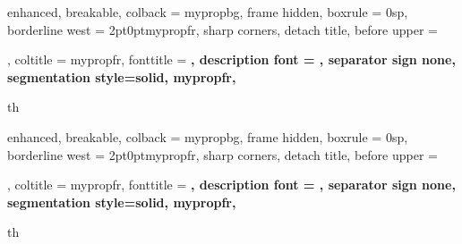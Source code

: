 
{%
	enhanced,
	breakable,
	colback = mypropbg,
	frame hidden,
	boxrule = 0sp,
	borderline west = {2pt}{0pt}{mypropfr},
	sharp corners,
	detach title,
	before upper = \tcbtitle\par\smallskip,
	coltitle = mypropfr,
	fonttitle = \bfseries\sffamily,
	description font = \mdseries,
	separator sign none,
	segmentation style={solid, mypropfr},
}
{th}

{%
	enhanced,
	breakable,
	colback = mypropbg,
	frame hidden,
	boxrule = 0sp,
	borderline west = {2pt}{0pt}{mypropfr},
	sharp corners,
	detach title,
	before upper = \tcbtitle\par\smallskip,
	coltitle = mypropfr,
	fonttitle = \bfseries\sffamily,
	description font = \mdseries,
	separator sign none,
	segmentation style={solid, mypropfr},
}
{th}


\newcommand*{\imag}{\mathrm{i}}


\newcommand{\bbA}{\mathbb{A}}	\newcommand{\bbB}{\mathbb{B}}
\newcommand{\bbC}{\mathbb{C}}	\newcommand{\bbD}{\mathbb{D}}
\newcommand{\bbE}{\mathbb{E}}	\newcommand{\bbF}{\mathbb{F}}
\newcommand{\bbG}{\mathbb{G}}	\newcommand{\bbH}{\mathbb{H}}
\newcommand{\bbI}{\mathbb{I}}	\newcommand{\bbJ}{\mathbb{J}}
\newcommand{\bbK}{\mathbb{K}}	\newcommand{\bbL}{\mathbb{L}}
\newcommand{\bbM}{\mathbb{M}}	\newcommand{\bbN}{\mathbb{N}}
\newcommand{\bbO}{\mathbb{O}}	\newcommand{\bbP}{\mathbb{P}}
\newcommand{\bbQ}{\mathbb{Q}}	\newcommand{\bbR}{\mathbb{R}}
\newcommand{\bbS}{\mathbb{S}}	\newcommand{\bbT}{\mathbb{T}}
\newcommand{\bbU}{\mathbb{U}}	\newcommand{\bbV}{\mathbb{V}}
\newcommand{\bbW}{\mathbb{W}}	\newcommand{\bbX}{\mathbb{X}}
\newcommand{\bbY}{\mathbb{Y}}	\newcommand{\bbZ}{\mathbb{Z}}


\newcommand{\mcA}{\mathcal{A}}	\newcommand{\mcB}{\mathcal{B}}
\newcommand{\mcC}{\mathcal{C}}	\newcommand{\mcD}{\mathcal{D}}
\newcommand{\mcE}{\mathcal{E}}	\newcommand{\mcF}{\mathcal{F}}
\newcommand{\mcG}{\mathcal{G}}	\newcommand{\mcH}{\mathcal{H}}
\newcommand{\mcI}{\mathcal{I}}	\newcommand{\mcJ}{\mathcal{J}}
\newcommand{\mcK}{\mathcal{K}}	\newcommand{\mcL}{\mathcal{L}}
\newcommand{\mcM}{\mathcal{M}}	\newcommand{\mcN}{\mathcal{N}}
\newcommand{\mcO}{\mathcal{O}}	\newcommand{\mcP}{\mathcal{P}}
\newcommand{\mcQ}{\mathcal{Q}}	\newcommand{\mcR}{\mathcal{R}}
\newcommand{\mcS}{\mathcal{S}}	\newcommand{\mcT}{\mathcal{T}}
\newcommand{\mcU}{\mathcal{U}}	\newcommand{\mcV}{\mathcal{V}}
\newcommand{\mcW}{\mathcal{W}}	\newcommand{\mcX}{\mathcal{X}}
\newcommand{\mcY}{\mathcal{Y}}	\newcommand{\mcZ}{\mathcal{Z}}


